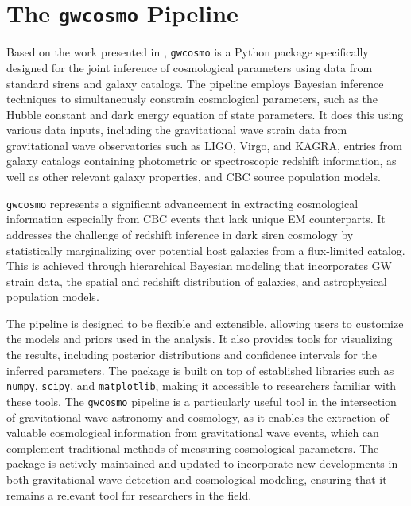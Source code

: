 \newpage

\section{The \texttt{gwcosmo} Pipeline}
Based on the work presented in \cite{gray2020cosmological,gray2022pixelated,gray2023joint}, \texttt{gwcosmo} is a Python package specifically designed for the joint inference of cosmological parameters using data from standard sirens and galaxy catalogs.  The pipeline employs Bayesian inference techniques to simultaneously constrain cosmological parameters, such as the Hubble constant and dark energy equation of state parameters. It does this using various data inputs, including the gravitational wave strain data from gravitational wave observatories such as LIGO, Virgo, and KAGRA, entries from galaxy catalogs containing photometric or spectroscopic redshift information, as well as other relevant galaxy properties, and \ac{CBC} source population models. 

\texttt{gwcosmo} represents a significant advancement in extracting cosmological information especially from \ac{CBC} events that lack unique \ac{EM} counterparts. It addresses the challenge of redshift inference in dark siren cosmology by statistically marginalizing over potential host galaxies from a flux-limited catalog. This is achieved through hierarchical Bayesian modeling that incorporates \ac{GW} strain data, the spatial and redshift distribution of galaxies, and astrophysical population models.

The pipeline is designed to be flexible and extensible, allowing users to customize the models and priors used in the analysis. It also provides tools for visualizing the results, including posterior distributions and confidence intervals for the inferred parameters. The package is built on top of established libraries such as \texttt{numpy}, \texttt{scipy}, and \texttt{matplotlib}, making it accessible to researchers familiar with these tools.
The \texttt{gwcosmo} pipeline is a particularly useful tool in the intersection of gravitational wave astronomy and cosmology, as it enables the extraction of valuable cosmological information from gravitational wave events, which can complement traditional methods of measuring cosmological parameters. The package is actively maintained and updated to incorporate new developments in both gravitational wave detection and cosmological modeling, ensuring that it remains a relevant tool for researchers in the field.


